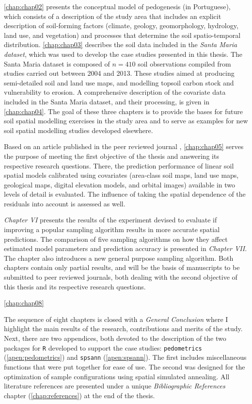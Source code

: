 \autoref{chap:chap02} presents the conceptual model of pedogenesis (in Portuguese), which consists of a 
description of the study area that includes an explicit description of soil-forming factors (climate, geology, 
geomorphology, hydrology, land use, and vegetation) and processes that determine the soil spatio-temporal 
distribution. \autoref{chap:chap03} describes the soil data included in the \emph{Santa Maria dataset}, which 
was used to develop the case studies presented in this thesis. The Santa Maria dataset is composed of 
$n = 410$ soil observations compiled from studies carried out between \num{2004} and \num{2013}. These studies 
aimed at producing semi-detailed soil and land use maps, and modelling topsoil carbon stock and vulnerability 
to erosion. A comprehensive description of the covariate data included in the Santa Maria dataset, and their 
processing, is given in \autoref{chap:chap04}. The goal of these three chapters is to provide the bases for 
future soil spatial modelling exercises in the study area and to serve as examples for new soil spatial 
modelling studies developed elsewhere.

Based on an article published in the peer reviewed journal \geoderma, \autoref{chap:chap05} serves the purpose 
of meeting the first objective of the thesis and answering its respective research questions. There, the 
prediction performance of linear soil spatial models calibrated using covariates (area-class soil maps, land 
use maps, geological maps, digital elevation models, and orbital images) available in two levels of detail is 
evaluated. The influence of taking the spatial dependence of the residuals into account is assessed as well. 

\emph{Chapter VI} presents the results of the experiment devised to evaluate if improving a popular sampling 
algorithm results in more accurate spatial predictions. The comparison of five sampling algorithms on how they 
affect estimated model parameters and prediction accuracy is presented in \emph{Chapter VII}. The chapter also
introduces a new general purpose sampling algorithm. Both chapters contain only partial results, and will be 
the basis of manuscripts to be submitted to peer reviewed journals, both dealing with the second objective of 
this thesis and its respective research questions.

\autoref{chap:chap08}

The sequence of eight chapters is closed with a \emph{General Conclusion} where I highlight the main results 
of the research, contributions and merits of the study. Next, there are two appendices, both devoted to the 
description of the two packages for \texttt{R} developed to support the case studies: \texttt{pedometrics} 
(\autoref{apen:pedometrics}) and \texttt{spsann} (\autoref{apen:spsann}). The first includes miscellaneous 
functions that were put together for ease of use. The second was designed for the optimization of sample 
configurations using spatial simulated annealing. All literature references are presented under a unique 
\emph{Bibliographic References} chapter (\autoref{chap:references}) at the end of the thesis.
